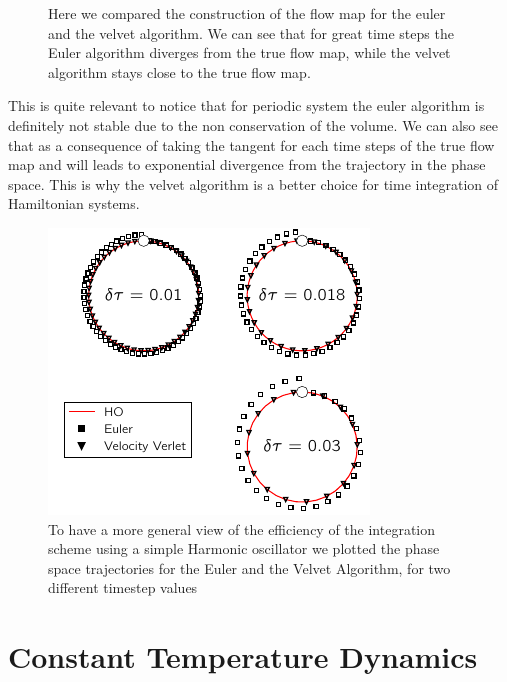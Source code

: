 \documentclass[ansiapaper]{report}
\begin{document}
\begin{multicols}{3}
\begin{figure}[H]
		\caption{\label{fig:Velevet_Construction} Here we compared the construction of the flow map for the euler and the velvet algorithm. We can see that for great time steps the Euler algorithm diverges from the true flow map, while the velvet algorithm stays close to the true flow map.}
	\end{figure}
	This is quite relevant to notice that for periodic system the euler algorithm is definitely not stable due to the non conservation of the volume. We can also see that as a consequence of taking the tangent for each time steps of the true flow map and will leads to exponential divergence from the trajectory in the phase space. This is why the velvet algorithm is a better choice for time integration of Hamiltonian systems.

    	\begin{figure}[H]
		\includegraphics[width=1\linewidth]{./figures/HarmonicOscillator.pdf}
		\caption{\label{fig:Velevet_euler} To have a more general view of the efficiency of the integration scheme using a simple Harmonic oscillator we plotted the phase space trajectories for the Euler and the Velvet Algorithm, for two different timestep values}
	\end{figure}

	\chapter{Constant Temperature Dynamics}
	

\end{multicols}
\end{document}

